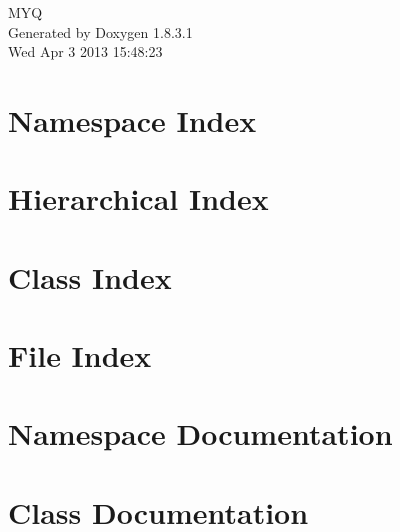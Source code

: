 \documentclass{book}
\begin{document}
\hypersetup{pageanchor=false,citecolor=blue}
\begin{titlepage}
\vspace*{7cm}
\begin{center}
{\Large M\-Y\-Q }\\
\vspace*{1cm}
{\large Generated by Doxygen 1.8.3.1}\\
\vspace*{0.5cm}
{\small Wed Apr 3 2013 15:48:23}\\
\end{center}
\end{titlepage}
\clearemptydoublepage
{}
\tableofcontents
\clearemptydoublepage
{}
\hypersetup{pageanchor=true,citecolor=blue}
\chapter{Namespace Index}

\chapter{Hierarchical Index}

\chapter{Class Index}

\chapter{File Index}

\chapter{Namespace Documentation}

\chapter{Class Documentation}





























\end{document}
